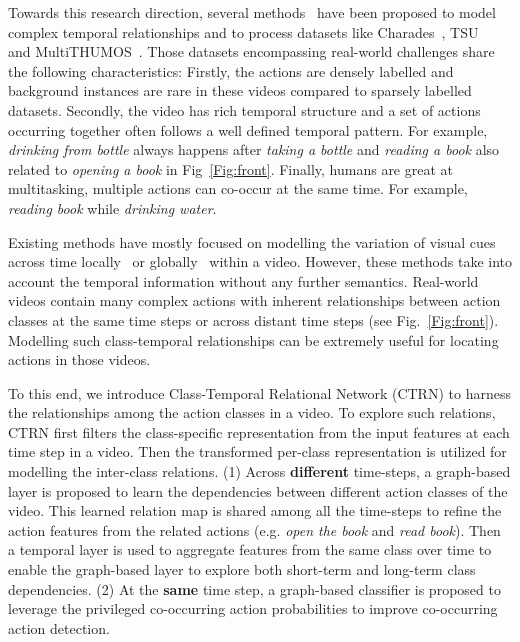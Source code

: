 \documentclass{bmvc2k}
\begin{document}
Towards this research direction, several methods~\cite{TGM1,Dai_2021_WACV,superevent} have been proposed to model complex temporal relationships and to process datasets like Charades~\cite{charades}, TSU~\cite{dai2020toyota} and MultiTHUMOS~\cite{multi-thumos}.
Those datasets encompassing real-world challenges share the following characteristics:
Firstly, the actions are densely labelled and background instances are rare in these videos compared to sparsely labelled datasets. 
Secondly, the video has rich temporal structure and a set of actions occurring together often follows a well defined temporal pattern. For example, \textit{drinking from bottle} always happens after \textit{taking a bottle} and \textit{reading a book} also related to \textit{opening a book} in Fig~\ref{Fig:front}.
Finally, humans are great at multitasking, multiple actions can co-occur at the same time. For example, \textit{reading book} while \textit{drinking water}.

Existing methods have mostly focused on modelling the variation of visual cues across time locally~\cite{lea2017temporal} or globally~\cite{superevent} within a video. However, these methods take into account the temporal information without any further semantics. Real-world videos contain many complex actions with inherent relationships between action classes at the same time steps or across distant time steps (see Fig.~\ref{Fig:front}). Modelling such class-temporal relationships can be extremely useful for locating actions in those videos. 




To this end, we introduce Class-Temporal Relational Network (CTRN) to harness the relationships among the action classes in a video. 
To explore such relations, CTRN first filters the class-specific representation from the input features at each time step in a video. 
Then the transformed per-class representation is utilized for modelling the inter-class relations. 
(1) Across \textbf{different} time-steps, a graph-based layer is proposed to learn the dependencies between different action classes of the video. 
This learned relation map is shared among all the time-steps to refine the action features from the related actions (e.g. \textit{open the book} and \textit{read book}). Then a temporal layer is used to aggregate features from the same class over time to enable the graph-based layer to explore both short-term and long-term class dependencies. 
(2) At the \textbf{same} time step, a graph-based classifier is proposed to leverage the privileged co-occurring action probabilities to improve co-occurring action detection.  
\end{document}
